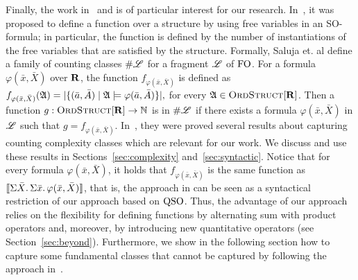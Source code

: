 Finally, the work in~\cite{SalujaST95} and \cite{ComptonG96} is of particular interest for our research. 
In~\cite{SalujaST95}, it was proposed to define a function over a structure by using free variables in an SO-formula; in particular, the function is defined by the number of instantiations of the free variables that are satisfied by the structure.
Formally, Saluja et. al \cite{SalujaST95} define a family of counting classes $\#\mathscr{L}$ for a fragment $\mathscr{L}$ of ${\rm FO}$. For a formula $\varphi(\bar{x},\bar{X})$ over $\mathbf{R}$, the function $f_{\varphi(\bar x, \bar X)}$ is defined as
$
f_{\varphi(\bar x, \bar X)}(\mathfrak{A}) = \vert \{(\bar{a},\bar{A}) \mid \mathfrak{A}\models\varphi(\bar{a},\bar{A})\}\vert,
$
for every $\mathfrak{A}\in\text{\sc OrdStruct}[\mathbf{R}]$. Then a function $g:\text{\sc OrdStruct}[\mathbf{R}]\to\mathbb{N}$ is in $\#\mathscr{L}$ if there exists a formula $\varphi(\bar{x},\bar{X})$ in $\mathscr{L}$ such that $g = f_{\varphi(\bar x, \bar X)}$. 
In~\cite{SalujaST95}, they were proved several results about capturing counting complexity classes which are relevant for our work. We discuss and use these results in Sections~\ref{sec:complexity} and~\ref{sec:syntactic}.
Notice that for every formula $\varphi(\bar{x},\bar{X})$, it holds that $f_{\varphi(\bar{x},\bar{X})}$ is the same function as ${\llbracket{}{\Sigma{\bar{X}}.\, \Sigma{\bar{x}}.\, \varphi(\bar{x},\bar{X})}\rrbracket}$, that is, the approach in \cite{SalujaST95} can be seen as a syntactical restriction of our approach based on ${\rm QSO}$. 
Thus, the advantage of our approach relies on the flexibility for defining  functions by alternating sum with product operators and, moreover, by introducing new quantitative operators (see Section~\ref{sec:beyond}).
Furthermore, we show in the following section how to capture some fundamental classes that cannot be captured by following the approach in~\cite{SalujaST95}.
